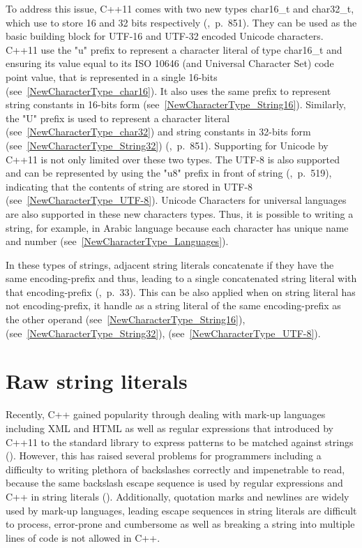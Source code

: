 \documentclass[11pt]{report}
\begin{document}
To address this issue, C++11 comes with two new types char16\_t and char32\_t, which use to store 16 and 32 bits respectively (\cite{Josuttis:2012:CppStandard},~p.~851). They can be used as the basic building block for UTF-16 and UTF-32 encoded Unicode characters. C++11 use the "u" prefix to represent a character literal of type char16\_t and ensuring its value equal to its ISO 10646 (and Universal Character Set) code point value, that is represented in a single 16-bits (see~\ref{NewCharacterType_char16}). It also uses the same prefix to represent string constants in 16-bits form (see~\ref{NewCharacterType_String16}). Similarly, the "U" prefix is used to represent a character literal (see~\ref{NewCharacterType_char32}) and string constants in 32-bits form (see~\ref{NewCharacterType_String32}) (\cite{Josuttis:2012:CppStandard},~p.~851). Supporting for Unicode by C++11 is not only limited over these two types. The UTF-8 is also supported and can be represented by using the "u8" prefix in front of string (\cite{Gregorie:professionalcpp},~p.~519), indicating that the contents of string are stored in UTF-8 (see~\ref{NewCharacterType_UTF-8}). Unicode Characters for universal languages are also supported in these new characters types. Thus, it is possible to writing a string, for example, in Arabic language because each character has unique name and number (see~\ref{NewCharacterType_Languages}).

In these types of strings, adjacent string literals concatenate if they have the same encoding-prefix and thus, leading to a single concatenated string literal with that encoding-prefix (\cite{ ISO:2011:Cpplanguage},~p.~33). This can be also applied when on string literal has not encoding-prefix, it handle as a string literal of the same encoding-prefix as the other operand (see~\ref{NewCharacterType_String16}), (see~\ref{NewCharacterType_String32}), (see~\ref{NewCharacterType_UTF-8}).


\section{Raw string literals}
\label{section: Raw string literals}
Recently, C++ gained popularity through dealing with mark-up languages including XML and HTML as well as regular expressions that introduced by C++11 to the standard library to express patterns to be matched against strings (\cite{Stroustrup:2012:Cpp11}). However, this has raised several problems for programmers including a difficulty to writing plethora of backslashes correctly and impenetrable to read, because the same backslash escape sequence is used by regular expressions and C++ in string literals (\cite{Stroustrup:2012:Cpp11}). Additionally, quotation marks and newlines are widely used by mark-up languages, leading escape sequences in string literals are difficult to process, error-prone and cumbersome as well as breaking a string into multiple lines of code is not allowed in C++.
\end{document}
